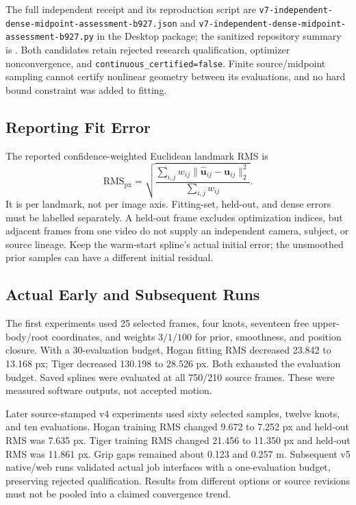 \documentclass[11pt,letterpaper]{article}
\newcommand{\code}[1]{\nolinkurl{#1}}
\begin{document}
The full independent receipt and its reproduction script are
\code{v7-independent-dense-midpoint-assessment-b927.json} and
\code{v7-independent-dense-midpoint-assessment-b927.py} in the Desktop package;
the sanitized repository summary is
.
Both candidates retain rejected research qualification, optimizer nonconvergence,
and \code{continuous_certified=false}. Finite source/midpoint sampling cannot
certify nonlinear geometry between its evaluations, and no hard bound
constraint was added to fitting.

\subsection{Reporting Fit Error}
The reported confidence-weighted Euclidean landmark RMS is
\begin{equation}
 \mathrm{RMS}_{\mathrm{px}}=
 \sqrt{\frac{\sum_{i,j}w_{ij}\|\widehat{\mathbf u}_{ij}-\mathbf u_{ij}\|_2^2}
 {\sum_{i,j}w_{ij}}}.
\end{equation}
It is per landmark, not per image axis. Fitting-set, held-out, and dense errors
must be labelled separately. A held-out frame excludes optimization indices,
but adjacent frames from one video do not supply an independent camera,
subject, or source lineage. Keep the warm-start spline's actual initial error;
the unsmoothed prior samples can have a different initial residual.

\subsection{Actual Early and Subsequent Runs}
The first experiments used 25 selected frames, four knots, seventeen free
upper-body/root coordinates, and weights $3/1/100$ for prior, smoothness, and
position closure. With a 30-evaluation budget, Hogan fitting RMS decreased
23.842 to 13.168 px; Tiger decreased 130.198 to 28.526 px. Both exhausted the
evaluation budget. Saved splines were evaluated at all 750/210 source frames.
These were measured software outputs, not accepted motion.

Later source-stamped v4 experiments used sixty selected samples, twelve knots,
and ten evaluations. Hogan training RMS changed 9.672 to 7.252 px and held-out
RMS was 7.635 px. Tiger training RMS changed 21.456 to 11.350 px and held-out
RMS was 11.861 px. Grip gaps remained about 0.123 and 0.257 m. Subsequent v5
native/web runs validated actual job interfaces with a one-evaluation budget,
preserving rejected qualification. Results from different options or source
revisions must not be pooled into a claimed convergence trend.
\end{document}
